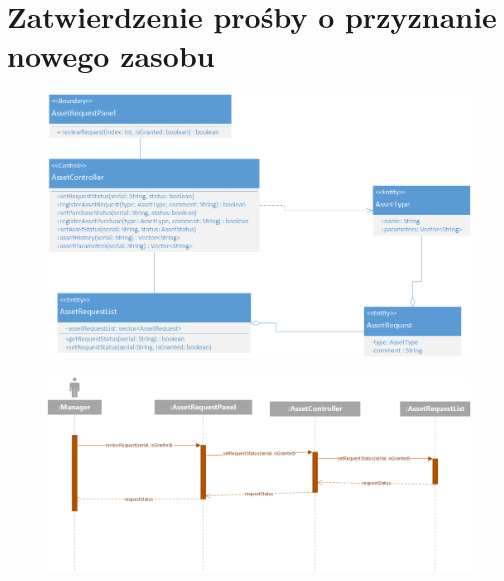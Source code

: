 \documentclass[11pt, a4paper, oneside]{report}
\begin{document}
\section{Zatwierdzenie prośby o przyznanie nowego zasobu}
\begin{figure}[H]
\centering
\includegraphics[scale=0.5]{zatwierdzenie_zasob_class.png}
\end{figure}
\begin{figure}[H]
\centering
\includegraphics[scale=0.5]{zatwierdzenie_zasob_sequence.png}
\end{figure}
\end{document}
